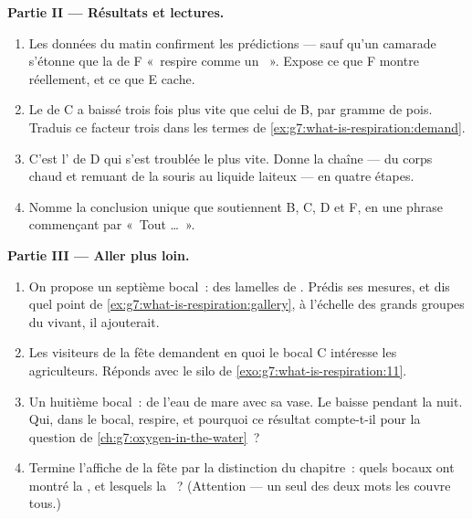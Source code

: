 \begin{problem}
\medskip\noindent\textbf{Partie II --- Résultats et lectures.}
\begin{enumerate}[resume]
  \item Les données du matin confirment les prédictions --- sauf
        qu'un camarade s'étonne que la  de F «~respire comme
        un ~». Expose ce que F montre réellement, et ce que E
        cache.
  \item Le  de C a baissé trois fois plus vite que celui
        de B, par gramme de pois. Traduis ce facteur trois dans les
        termes de \cref{ex:g7:what-is-respiration:demand}.
  \item C'est l' de D qui s'est troublée le plus vite.
        Donne la chaîne --- du corps chaud et remuant de la souris
        au liquide laiteux --- en quatre étapes.
  \item Nomme la conclusion unique que soutiennent B, C, D et F,
        en une phrase commençant par «~Tout \dots~».
\end{enumerate}

\medskip\noindent\textbf{Partie III --- Aller plus loin.}
\begin{enumerate}[resume]
  \item On propose un septième bocal~: des lamelles de .
        Prédis ses mesures, et dis quel point de
        \cref{ex:g7:what-is-respiration:gallery}, à l'échelle des
        grands groupes du vivant, il ajouterait.
  \item Les visiteurs de la fête demandent en quoi le bocal C
        intéresse les agriculteurs. Réponds avec le silo de
        \cref{exo:g7:what-is-respiration:11}.
  \item Un huitième bocal~: de l'eau de mare avec sa vase. Le
         baisse pendant la nuit. Qui, dans le bocal,
        respire, et pourquoi ce résultat compte-t-il pour la
        question de \cref{ch:g7:oxygen-in-the-water}~?
  \item Termine l'affiche de la fête par la distinction du
        chapitre~: quels bocaux ont montré la \emph{},
        et lesquels la \emph{}~? (Attention --- un seul
        des deux mots les couvre tous.)
\end{enumerate}
\end{problem}
